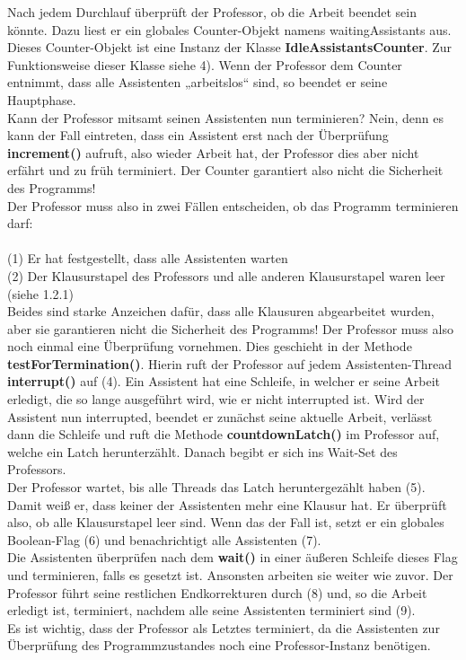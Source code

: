 \documentclass[12pt,a4paper]{article}
\begin{document}
Nach jedem Durchlauf überprüft der Professor, ob die Arbeit beendet sein könnte. Dazu liest er ein globales Counter-Objekt namens waitingAssistants aus. Dieses Counter-Objekt ist eine Instanz der Klasse \textbf{IdleAssistantsCounter}. Zur Funktionsweise dieser Klasse siehe 4). Wenn der Professor dem Counter entnimmt, dass alle Assistenten „arbeitslos“ sind, so beendet er seine Hauptphase.\\ 
Kann der Professor mitsamt seinen Assistenten nun terminieren? Nein, denn es kann der Fall eintreten, dass ein Assistent erst nach der Überprüfung \textbf{increment()} aufruft, also wieder Arbeit hat, der Professor dies aber nicht erfährt und zu früh terminiert. Der Counter garantiert also nicht die Sicherheit des Programms!\\ 
Der Professor muss also in zwei Fällen entscheiden, ob das Programm terminieren darf:\\\\(1) Er hat festgestellt, dass alle Assistenten warten\\
(2) Der Klausurstapel des Professors und alle anderen Klausurstapel waren leer (siehe 1.2.1)\\

Beides sind starke Anzeichen dafür, dass alle Klausuren abgearbeitet wurden, aber sie garantieren nicht die Sicherheit des Programms! Der Professor muss also noch einmal eine Überprüfung vornehmen. Dies geschieht in der Methode \textbf{testForTermination()}.
Hierin ruft der Professor auf jedem Assistenten-Thread \textbf{interrupt()} auf (4). Ein Assistent hat eine Schleife, in welcher er seine Arbeit erledigt, die so lange ausgeführt wird, wie er nicht interrupted ist. Wird der Assistent nun interrupted, beendet er zunächst seine aktuelle Arbeit, verlässt dann die Schleife und ruft die Methode \textbf{countdownLatch()} im Professor auf, welche ein Latch herunterzählt. Danach begibt er sich ins Wait-Set des Professors.\\
Der Professor wartet, bis alle Threads das Latch heruntergezählt haben (5). Damit weiß er, dass keiner der Assistenten mehr eine Klausur hat. Er überprüft also, ob alle Klausurstapel leer sind. Wenn das der Fall ist, setzt er ein globales Boolean-Flag (6) und benachrichtigt alle Assistenten (7).\\ Die Assistenten überprüfen nach dem \textbf{wait()} in einer äußeren Schleife dieses Flag und terminieren, falls es gesetzt ist. Ansonsten arbeiten sie weiter wie zuvor. Der Professor führt seine  restlichen Endkorrekturen durch (8) und, so die Arbeit erledigt ist, terminiert, nachdem alle seine Assistenten terminiert sind (9).\\ Es ist wichtig, dass der Professor als Letztes terminiert, da die Assistenten zur Überprüfung des Programmzustandes noch eine Professor-Instanz benötigen.
\end{document}
